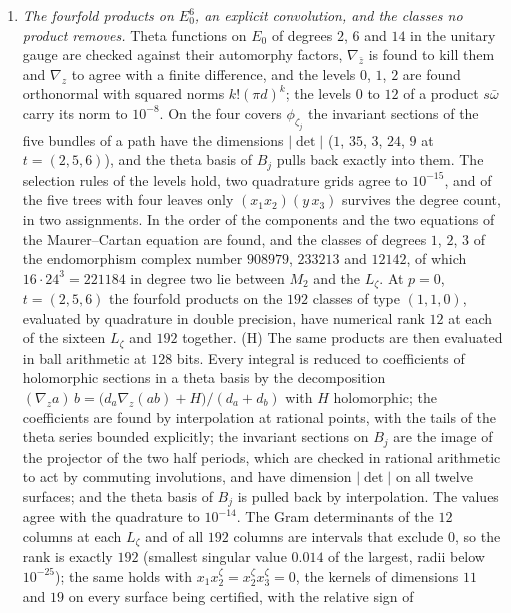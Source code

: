 \begin{enumerate}[label=\textup{(\Roman*)},leftmargin=*]
\item \emph{The fourfold products on $E_0^6$, an explicit convolution,
  and the classes no product removes.} Theta functions on $E_{0}$ of degrees
  $2$, $6$ and $14$ in the unitary gauge are checked against their automorphy
  factors, $\nabla_{\bar z}$ is found to kill them and $\nabla_{z}$ to agree
  with a finite difference, and the levels $0$, $1$, $2$ are found
  orthonormal with squared norms $k!(\pi d)^{k}$; the levels $0$ to $12$ of a
  product $s\bar\omega$ carry its norm to $10^{-8}$. On the four covers
  $\phi_{\zeta_{j}}$ the invariant sections of the five bundles of a path
  have the dimensions $|\det|$ ($1$, $35$, $3$, $24$, $9$ at $t=(2,5,6)$),
  and the theta basis of $B_{j}$ pulls back exactly into them. The selection
  rules of the levels hold, two quadrature grids agree to $10^{-15}$, and of
  the five trees with four leaves only $(x_{1}x_{2})(y\,x_{3})$ survives the
  degree count, in two assignments. In the order of
   the components and the two equations of
  the Maurer--Cartan equation are found, and the classes of degrees $1$, $2$,
  $3$ of the endomorphism complex number $908979$, $233213$ and $12142$, of
  which $16\cdot24^{3}=221184$ in degree two lie between $M_{2}$ and the
  $L_{\zeta}$. At $p=0$, $t=(2,5,6)$ the fourfold products on the $192$
  classes of type $(1,1,0)$, evaluated by quadrature in double precision,
  have numerical rank $12$ at each of the sixteen $L_{\zeta}$ and $192$
  together. (H) The same products are then evaluated in ball arithmetic at
  $128$ bits. Every integral is reduced to coefficients of holomorphic
  sections in a theta basis by the decomposition
  $(\nabla_{z}a)\,b=\bigl(d_{a}\nabla_{z}(ab)+H\bigr)/(d_{a}+d_{b})$ with
  $H$ holomorphic; the coefficients are found by interpolation at rational
  points, with the tails of the theta series bounded explicitly; the
  invariant sections on $B_{j}$ are the image of the projector of the two
  half periods, which are checked in rational arithmetic to act by commuting
  involutions, and have dimension $|\det|$ on all twelve surfaces; and the
  theta basis of $B_{j}$ is pulled back by interpolation. The values agree
  with the quadrature to $10^{-14}$. The Gram determinants of the $12$
  columns at each $L_{\zeta}$ and of all $192$ columns are intervals that
  exclude $0$, so the rank is exactly $192$ (smallest singular value $0.014$
  of the largest, radii below $10^{-25}$); the same holds with
  $x_{1}x_{2}^{\zeta}=x_{2}^{\zeta}x_{3}^{\zeta}=0$, the kernels of dimensions
  $11$ and $19$ on every surface being certified, with the relative sign of

\end{enumerate}
